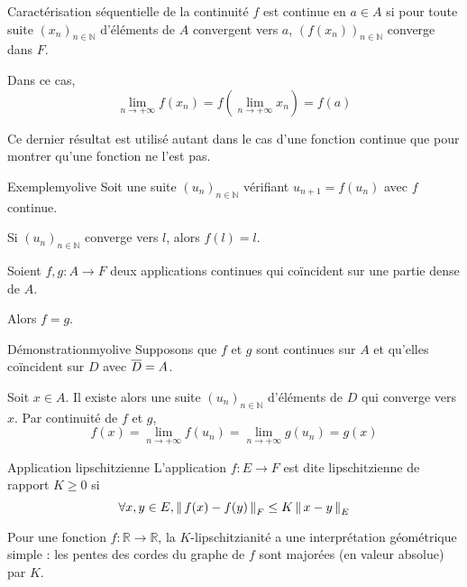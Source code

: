     \begin{prop}{Caractérisation séquentielle de la continuité}{}
        $f$ est continue en $a \in A$ si pour toute suite $(x_n)_{n \in \mathbb{N}}$ d’éléments de $A$ convergent vers $a$, $\left(f(x_n)\right)_{n \in \mathbb{N}}$ converge dans $F$.

        Dans ce cas, 
        \[ \lim\limits_{n \rightarrow +\infty} f(x_n) = f \left(\lim\limits_{n \rightarrow +\infty} x_n\right) = f(a) \] 
    \end{prop}

    Ce dernier résultat est utilisé autant dans le cas d’une fonction continue que pour montrer qu’une fonction ne l’est pas.

    \begin{omed}{Exemple}{myolive}
        Soit une suite $(u_n)_{n \in \mathbb{N}}$ vérifiant $u_{n+1} = f(u_n)$ avec $f$ continue.

        Si $(u_n)_{n \in \mathbb{N}}$ converge vers $l$, alors $f(l)=l$.
    \end{omed}

    \begin{prop}{}{}
        Soient $f,g : A \rightarrow F$ deux applications continues qui coïncident sur une partie dense de $A$. 

        Alors $f = g$.
    \end{prop}

    \begin{demo}{Démonstration}{myolive}
        Supposons que $f$ et $g$ sont continues sur $A$ et qu’elles coïncident sur $D$ avec $\overline{D} = A$.

        Soit $x \in A$. Il existe alors une suite $(u_n)_{n \in \mathbb{N}}$ d’éléments de $D$ qui converge vers $x$. Par continuité de $f$ et $g$,
        \[ f(x) = \lim\limits_{n \rightarrow +\infty} f(u_n) = \lim\limits_{n \rightarrow +\infty} g(u_n) = g(x) \] 
    \end{demo}

    \begin{defi}{Application lipschitzienne}{}
        L’application $f : E \rightarrow F$ est dite lipschitzienne de rapport $K \geq 0$ si 
        \[ \forall x,y \in E, \left\lVert\,f(x) - f(y)\,\right\rVert_F \leq K \left\lVert\,x-y\,\right\rVert_E \] 
    \end{defi}

    Pour une fonction $f: \mathbb{R} \rightarrow \mathbb{R}$, la $K$-lipschitzianité a une interprétation géométrique simple : les pentes des cordes du graphe de $f$ sont majorées (en valeur absolue) par $K$.

